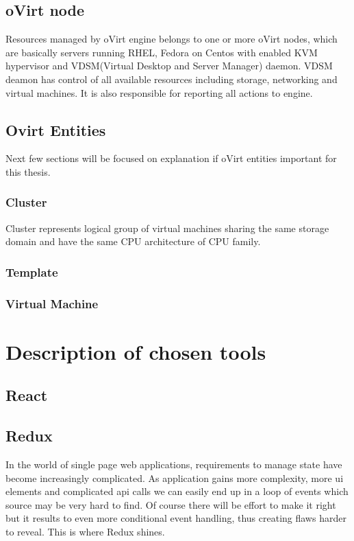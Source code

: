 \section{oVirt node}
Resources managed by oVirt engine belongs to one or more oVirt nodes, which are basically servers running RHEL, Fedora on Centos with enabled KVM hypervisor and VDSM(Virtual Desktop and Server Manager) daemon. VDSM deamon has control of all available resources including storage, networking and virtual machines. It is also responsible for reporting all actions to engine.

\section{Ovirt Entities}
Next few sections will be focused on explanation if oVirt entities important for this thesis.

\subsection{Cluster}
Cluster represents logical group of virtual machines sharing the same storage domain and have the same CPU architecture of CPU family.

\subsection{Template}


\subsection{Virtual Machine}

\chapter{Description of chosen tools}

\section{React}
\section{Redux}
In the world of single page web applications, requirements to manage state have become increasingly complicated. As application gains more complexity, more ui elements and complicated api calls we can easily end up in a loop of events which source may be very hard to find. Of course there will be effort to make it right but it results to even more conditional event handling, thus creating flaws harder to reveal. This is where Redux shines.

